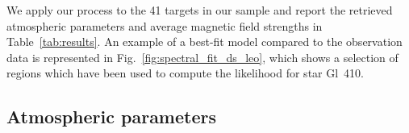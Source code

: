 We apply our process to the 41 targets in our sample and report the retrieved atmospheric parameters and average magnetic field strengths in Table~\ref{tab:results}.
An example of a best-fit model compared to the observation data is represented in Fig.~\ref{fig:spectral_fit_ds_leo}, which shows a selection of regions which have been used to compute the likelihood for star Gl~410.

\subsection{Atmospheric parameters}





